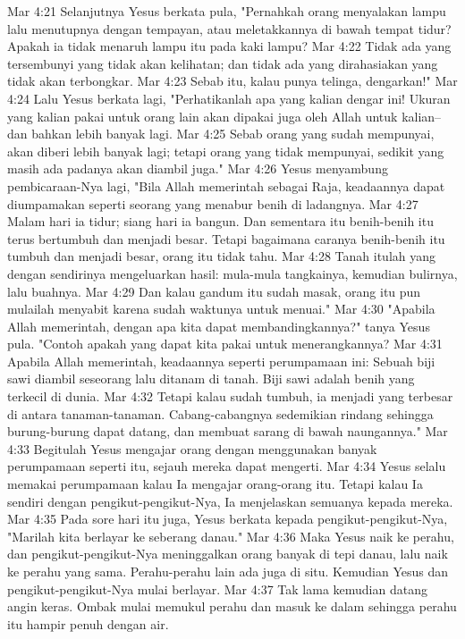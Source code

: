 Mar 4:21  Selanjutnya Yesus berkata pula, "Pernahkah orang menyalakan lampu lalu menutupnya dengan tempayan, atau meletakkannya di bawah tempat tidur? Apakah ia tidak menaruh lampu itu pada kaki lampu?
Mar 4:22  Tidak ada yang tersembunyi yang tidak akan kelihatan; dan tidak ada yang dirahasiakan yang tidak akan terbongkar.
Mar 4:23  Sebab itu, kalau punya telinga, dengarkan!"
Mar 4:24  Lalu Yesus berkata lagi, "Perhatikanlah apa yang kalian dengar ini! Ukuran yang kalian pakai untuk orang lain akan dipakai juga oleh Allah untuk kalian--dan bahkan lebih banyak lagi.
Mar 4:25  Sebab orang yang sudah mempunyai, akan diberi lebih banyak lagi; tetapi orang yang tidak mempunyai, sedikit yang masih ada padanya akan diambil juga."
Mar 4:26  Yesus menyambung pembicaraan-Nya lagi, "Bila Allah memerintah sebagai Raja, keadaannya dapat diumpamakan seperti seorang yang menabur benih di ladangnya.
Mar 4:27  Malam hari ia tidur; siang hari ia bangun. Dan sementara itu benih-benih itu terus bertumbuh dan menjadi besar. Tetapi bagaimana caranya benih-benih itu tumbuh dan menjadi besar, orang itu tidak tahu.
Mar 4:28  Tanah itulah yang dengan sendirinya mengeluarkan hasil: mula-mula tangkainya, kemudian bulirnya, lalu buahnya.
Mar 4:29  Dan kalau gandum itu sudah masak, orang itu pun mulailah menyabit karena sudah waktunya untuk menuai."
Mar 4:30  "Apabila Allah memerintah, dengan apa kita dapat membandingkannya?" tanya Yesus pula. "Contoh apakah yang dapat kita pakai untuk menerangkannya?
Mar 4:31  Apabila Allah memerintah, keadaannya seperti perumpamaan ini: Sebuah biji sawi diambil seseorang lalu ditanam di tanah. Biji sawi adalah benih yang terkecil di dunia.
Mar 4:32  Tetapi kalau sudah tumbuh, ia menjadi yang terbesar di antara tanaman-tanaman. Cabang-cabangnya sedemikian rindang sehingga burung-burung dapat datang, dan membuat sarang di bawah naungannya."
Mar 4:33  Begitulah Yesus mengajar orang dengan menggunakan banyak perumpamaan seperti itu, sejauh mereka dapat mengerti.
Mar 4:34  Yesus selalu memakai perumpamaan kalau Ia mengajar orang-orang itu. Tetapi kalau Ia sendiri dengan pengikut-pengikut-Nya, Ia menjelaskan semuanya kepada mereka.
Mar 4:35  Pada sore hari itu juga, Yesus berkata kepada pengikut-pengikut-Nya, "Marilah kita berlayar ke seberang danau."
Mar 4:36  Maka Yesus naik ke perahu, dan pengikut-pengikut-Nya meninggalkan orang banyak di tepi danau, lalu naik ke perahu yang sama. Perahu-perahu lain ada juga di situ. Kemudian Yesus dan pengikut-pengikut-Nya mulai berlayar.
Mar 4:37  Tak lama kemudian datang angin keras. Ombak mulai memukul perahu dan masuk ke dalam sehingga perahu itu hampir penuh dengan air.
